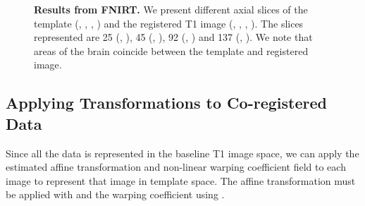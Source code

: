 \begin{figure}
{} \hspace*{-0.9em}
   \hspace*{-0.9em}
   \hspace*{-0.9em}
  \hspace*{-0.9em}
\caption{{\bf Results from FNIRT.} We present different axial slices of the template (\protect{}, \protect{}, \protect{}, \protect{}) and the registered T1 image (\protect{}, \protect{}, \protect{}, \protect{}).  The slices represented are 25 (\protect{}, \protect{}), 45 (\protect{}, \protect{}), 92 (\protect{}, \protect{}) and 137 (\protect{}, \protect{}).  We note that areas of the brain coincide between the template and registered image.}
\label{fig:fnirt_slice}
\end{figure}



\subsection{Applying Transformations to Co-registered Data}
Since all the data is represented in the baseline T1 image space, we can apply the estimated affine transformation and non-linear warping coefficient field to each image to represent that image in template space.  The affine transformation must be applied with  and the warping coefficient using .  



